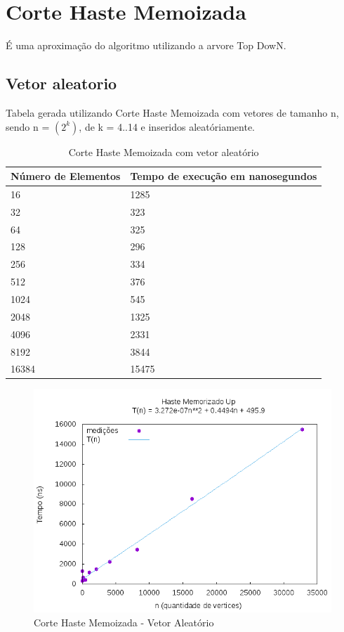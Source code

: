 \documentclass[12pt,a4paper,twoside]{report}
\begin{document}
\section{Corte Haste Memoizada}

É uma aproximação do algoritmo utilizando a arvore Top DowN.

\subsection{Vetor aleatorio}
Tabela gerada utilizando Corte Haste Memoizada com vetores de tamanho n, sendo n = $(2^k)$, de k = 4..14 e inseridos aleatóriamente.
\begin{table}[H]
\centering
\caption{Corte Haste Memoizada com vetor aleatório}
\label{my-label}
\begin{tabular}{|l|l|}
\hline
\multicolumn{1}{|c|}{\textbf{Número de Elementos}} & \multicolumn{1}{c|}{\textbf{Tempo de execução em nanosegundos}} \\ \hline
16 & 1285 \\ \hline
32 & 323 \\ \hline
64 & 325 \\ \hline
128 & 296 \\ \hline
256 & 334 \\ \hline
512 & 376 \\ \hline
1024 & 545 \\ \hline
2048 & 1325 \\ \hline
4096 & 2331 \\ \hline
8192 & 3844 \\ \hline
16384 & 15475 \\ \hline
\end{tabular}
\end{table}

\begin{figure}[H]
    \centering
    \includegraphics[width=0.7\linewidth]{graficos/CorteHasteMemorizado/Aleatorio/HasteMemo.png}
  \caption{Corte Haste Memoizada - Vetor Aleatório}
\end{figure}
\end{document}
